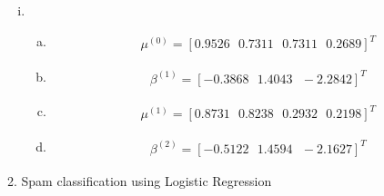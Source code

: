 \documentclass[paper=a4, fontsize=11pt]{scrartcl} %
\numberwithin{equation}{section} %
\numberwithin{figure}{section} %
\numberwithin{table}{section} %
\begin{document}
\begin{enumerate}[(i)]
\item
\begin{enumerate}[(a)]
\item
\begin{align*}
\mu^{(0)} = [0.9526\ \ \ 0.7311\ \ \ 0.7311\ \ \ 0.2689]^T
\end{align*}
\item
\begin{align*}
\beta^{(1)} = [-0.3868\ \ \ 1.4043\ \ \ -2.2842]^T
\end{align*}
\item
\begin{align*}
\mu^{(1)} = [0.8731\ \ \ 0.8238\ \ \ 0.2932\ \ \ 0.2198]^T
\end{align*}
\item
\begin{align*}
\beta^{(2)} = [-0.5122\ \ \ 1.4594\ \ \ -2.1627]^T
\end{align*}
\end{enumerate}

\end{enumerate}

\newpage %
 {\Large 2. \indent Spam classification using Logistic Regression}
\\
\end{document}
